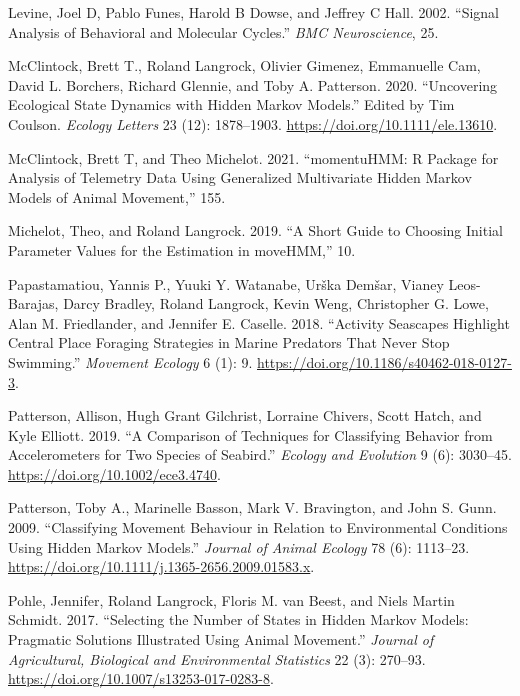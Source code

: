 \documentclass[english,msc,numbers,hidelinks]{coppe}
\newlength{\cslhangindent}
\newenvironment{CSLReferences}[2] %
 {%
  \setlength{\parindent}{0pt}
  \ifodd #1 \everypar{\setlength{\hangindent}{\cslhangindent}}\ignorespaces\fi
  \ifnum #2 > 0
  \setlength{\parskip}{#2\baselineskip}
  \fi
 }%
 {}
\begin{document}
\begin{CSLReferences}{1}{0}
  \leavevmode{}%
  Levine, Joel D, Pablo Funes, Harold B Dowse, and Jeffrey C Hall. 2002. {``Signal Analysis of Behavioral and Molecular Cycles.''} \emph{BMC Neuroscience}, 25.

  \leavevmode{}%
  McClintock, Brett T., Roland Langrock, Olivier Gimenez, Emmanuelle Cam, David L. Borchers, Richard Glennie, and Toby A. Patterson. 2020. {``Uncovering Ecological State Dynamics with Hidden Markov Models.''} Edited by Tim Coulson. \emph{Ecology Letters} 23 (12): 1878--1903. \url{https://doi.org/10.1111/ele.13610}.

  \leavevmode{}%
  McClintock, Brett T, and Theo Michelot. 2021. {``momentuHMM: R Package for Analysis of Telemetry Data Using Generalized Multivariate Hidden Markov Models of Animal Movement,''} 155.

  \leavevmode{}%
  Michelot, Theo, and Roland Langrock. 2019. {``A Short Guide to Choosing Initial Parameter Values for the Estimation in moveHMM,''} 10.

  \leavevmode{}%
  Papastamatiou, Yannis P., Yuuki Y. Watanabe, Urška Demšar, Vianey Leos-Barajas, Darcy Bradley, Roland Langrock, Kevin Weng, Christopher G. Lowe, Alan M. Friedlander, and Jennifer E. Caselle. 2018. {``Activity Seascapes Highlight Central Place Foraging Strategies in Marine Predators That Never Stop Swimming.''} \emph{Movement Ecology} 6 (1): 9. \url{https://doi.org/10.1186/s40462-018-0127-3}.

  \leavevmode{}%
  Patterson, Allison, Hugh Grant Gilchrist, Lorraine Chivers, Scott Hatch, and Kyle Elliott. 2019. {``A Comparison of Techniques for Classifying Behavior from Accelerometers for Two Species of Seabird.''} \emph{Ecology and Evolution} 9 (6): 3030--45. \url{https://doi.org/10.1002/ece3.4740}.

  \leavevmode{}%
  Patterson, Toby A., Marinelle Basson, Mark V. Bravington, and John S. Gunn. 2009. {``Classifying Movement Behaviour in Relation to Environmental Conditions Using Hidden Markov Models.''} \emph{Journal of Animal Ecology} 78 (6): 1113--23. \url{https://doi.org/10.1111/j.1365-2656.2009.01583.x}.

  \leavevmode{}%
  Pohle, Jennifer, Roland Langrock, Floris M. van Beest, and Niels Martin Schmidt. 2017. {``Selecting the Number of States in Hidden Markov Models: Pragmatic Solutions Illustrated Using Animal Movement.''} \emph{Journal of Agricultural, Biological and Environmental Statistics} 22 (3): 270--93. \url{https://doi.org/10.1007/s13253-017-0283-8}.


\end{CSLReferences}
\end{document}
